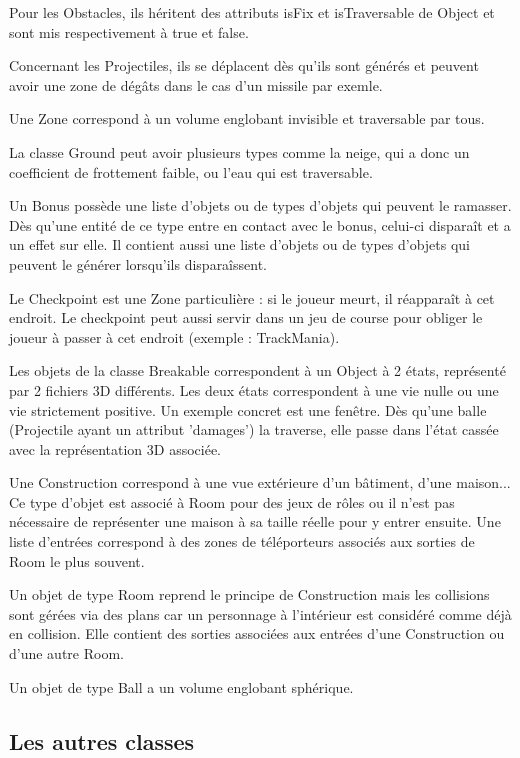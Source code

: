 Pour les Obstacles, ils héritent des attributs isFix et isTraversable de Object et sont mis respectivement à true et false.

Concernant les Projectiles, ils se déplacent dès qu'ils sont générés et peuvent avoir une zone de dégâts dans le cas d'un missile par exemle.

Une Zone correspond à un volume englobant invisible et traversable par tous.

La classe Ground peut avoir plusieurs types comme la neige, qui a donc un coefficient de frottement faible, ou l'eau qui est traversable.

Un Bonus possède une liste d'objets ou de types d'objets qui peuvent le ramasser. Dès qu'une entité de ce type entre en contact avec le bonus, celui-ci
disparaît et a un effet sur elle. 
Il contient aussi une liste d'objets ou de types d'objets qui peuvent le générer lorsqu'ils disparaîssent.

Le Checkpoint est une Zone particulière : si le joueur meurt, il réapparaît à cet endroit. 
Le checkpoint peut aussi servir dans un jeu de course pour obliger le joueur à passer à cet endroit (exemple : TrackMania).

Les objets de la classe Breakable correspondent à un Object à 2 états, représenté par 2 fichiers 3D différents. Les deux états correspondent
à une vie nulle ou une vie strictement positive. Un exemple concret est une fenêtre. 
Dès qu'une balle (Projectile ayant un attribut 'damages') la traverse, elle passe dans l'état cassée avec la représentation 3D associée.

Une Construction correspond à une vue extérieure d'un bâtiment, d'une maison...
Ce type d'objet est associé à Room pour des jeux de rôles ou il n'est pas nécessaire de représenter une maison à sa taille réelle pour y entrer ensuite.
Une liste d'entrées correspond à des zones de téléporteurs associés aux sorties de Room le plus souvent.

Un objet de type Room reprend le principe de Construction mais les collisions sont gérées via des plans car un personnage à l'intérieur est considéré comme déjà en collision. 
Elle contient des sorties associées aux entrées d'une Construction ou d'une autre Room.

Un objet de type Ball a un volume englobant sphérique.

\subsection{Les autres classes}

